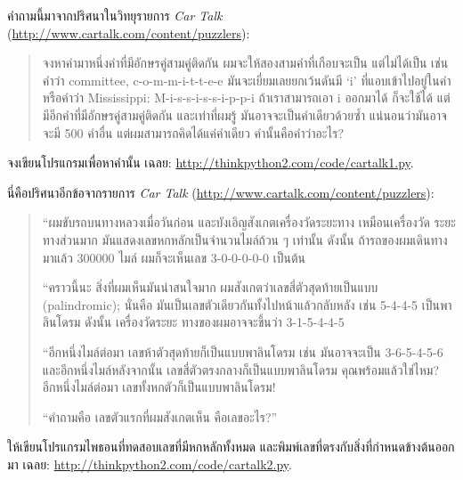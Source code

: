 \begin{exercise}

คำถามนี้มาจากปริศนาในวิทยุรายการ {\em Car Talk} (\url{http://www.cartalk.com/content/puzzlers}):

\begin{quote}
จงหาคำมาหนึ่งคำที่มีอักษรคู่สามคู่ติดกัน ผมจะให้สองสามคำที่เกือบจะเป็น แต่ไม่ได้เป็น เช่น
คำว่า committee, c-o-m-m-i-t-t-e-e มันจะเยี่ยมเลยยกเว้นดันมี `i' ที่แอบเข้าไปอยู่ในคำ
หรือคำว่า Mississippi: M-i-s-s-i-s-s-i-p-p-i ถ้าเราสามารถเอา i ออกมาได้ ก็จะใช้ได้
แต่มีอีกคำที่มีอักษรคู่สามคู่ติดกัน และเท่าที่ผมรู้ มันอาจจะเป็นคำเดียวด้วยซ้ำ แน่นอนว่ามันอาจจะมี
500 คำอื่น แต่ผมสามารถคิดได้แค่คำเดียว คำนั้นคือคำว่าอะไร?
\end{quote}

จงเขียนโปรแกรมเพื่อหาคำนั้น
เฉลย: \url{http://thinkpython2.com/code/cartalk1.py}.

\end{exercise}


\begin{exercise}
นี่คือปริศนาอีกข้อจากรายการ {\em Car Talk} (\url{http://www.cartalk.com/content/puzzlers}):

\begin{quote}
``ผมขับรถบนทางหลวงเมื่อวันก่อน และบังเอิญสังเกตเครื่องวัดระยะทาง เหมือนเครื่องวัด
ระยะทางส่วนมาก มันแสดงเลขหกหลักเป็นจำนวนไมล์ถ้วน ๆ เท่านั้น ดังนั้น 
ถ้ารถของผมเดินทางมาแล้ว 300000 ไมล์ ผมก็จะเห็นเลข 3-0-0-0-0-0 เป็นต้น

``คราวนี้นะ สิ่งที่ผมเห็นมันน่าสนใจมาก ผมสังเกตว่าเลขสี่ตัวสุดท้ายเป็นแบบ (palindromic);
นั่นคือ มันเป็นเลขตัวเดียวกันทั้งไปหน้าแล้วกลับหลัง เช่น 5-4-4-5 เป็นพาลินโดรม ดังนั้น เครื่องวัดระยะ
ทางของผมอาจจะขึ้นว่า 3-1-5-4-4-5

``อีกหนึ่งไมล์ต่อมา เลขห้าตัวสุดท้ายก็เป็นแบบพาลินโดรม เช่น มันอาจจะเป็น 3-6-5-4-5-6
และอีกหนึ่งไมล์หลังจากนั้น เลขสี่ตัวตรงกลางก็เป็นแบบพาลินโดรม 
คุณพร้อมแล้วใช่ไหม?
อีกหนึ่งไมล์ต่อมา เลขทั้งหกตัวก็เป็นแบบพาลินโดรม! 

``คำถามคือ เลขตัวแรกที่ผมสังเกตเห็น คือเลขอะไร?''
\end{quote}

ให้เขียนโปรแกรมไพธอนที่ทดสอบเลขที่มีหกหลักทั้งหมด และพิมพ์เลขที่ตรงกับสิ่งที่กำหนดข้างต้นออกมา
เฉลย: \url{http://thinkpython2.com/code/cartalk2.py}.

\end{exercise}


